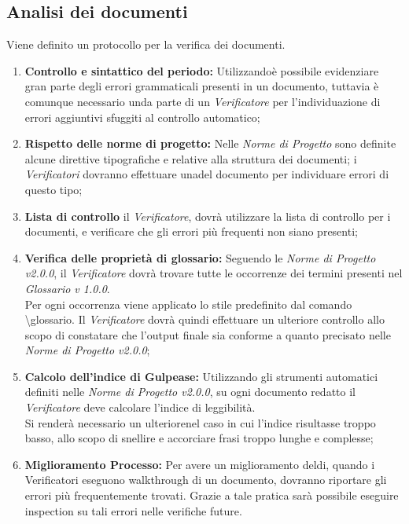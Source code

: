 \subsection{Analisi dei documenti}
Viene definito un protocollo per la verifica dei documenti.
\begin{enumerate}
	\item \textbf{Controllo e sintattico del periodo:} Utilizzandoè possibile evidenziare gran parte degli errori grammaticali presenti in un documento, tuttavia è comunque necessario unda parte di un \textit{Verificatore} per l'individuazione di errori aggiuntivi sfuggiti al controllo automatico;
	\item \textbf{Rispetto delle norme di progetto:} Nelle \textit{Norme di Progetto} sono definite alcune direttive tipografiche e relative alla struttura dei documenti;
	i \textit{Verificatori} dovranno effettuare unadel documento per individuare errori di questo tipo;
	\item \textbf{Lista di controllo} il \textit{Verificatore}, dovrà utilizzare la lista di controllo per i documenti, e verificare che gli errori più frequenti non siano presenti;
	\item \textbf{Verifica delle proprietà di glossario:} Seguendo le \textit{Norme di Progetto v2.0.0}, il \textit{Verificatore} dovrà trovare tutte le occorrenze dei termini presenti nel \textit{Glossario v 1.0.0}.\\
	Per ogni occorrenza viene applicato lo stile  predefinito dal comando \textbackslash glossario.
	Il \textit{Verificatore} dovrà quindi effettuare un ulteriore controllo allo scopo di constatare che l’output finale sia conforme a quanto precisato nelle \textit{Norme di Progetto v2.0.0};
	\item \textbf{Calcolo dell'indice di Gulpease:} Utilizzando gli strumenti automatici definiti nelle \textit{Norme di Progetto v2.0.0}, su ogni documento redatto il \textit{Verificatore} deve calcolare l’indice di leggibilità.\\
	Si renderà necessario un ulteriorenel caso in cui l’indice risultasse troppo basso, allo scopo di snellire e accorciare frasi troppo lunghe e complesse;
	\item \textbf{Miglioramento Processo:} Per avere un miglioramento deldi, quando i Verificatori eseguono walkthrough di un documento, dovranno riportare gli errori più frequentemente
	trovati. Grazie a tale pratica sarà possibile eseguire inspection su tali errori nelle verifiche future.
	
\end{enumerate}


